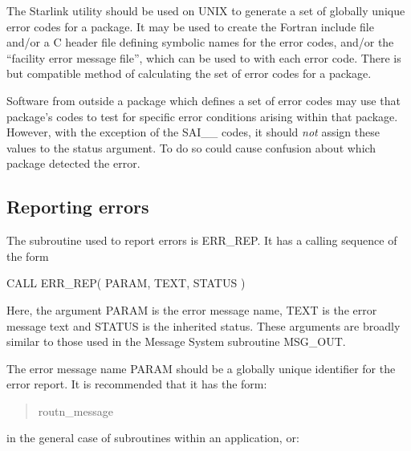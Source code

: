 \documentclass[twoside,11pt]{starlink}
\begin{document}
The Starlink utility
 
should be used on UNIX to generate
a set of globally unique error codes for a package. It may be used to create
the Fortran include file and/or a C header file defining symbolic names
for the error codes, and/or the ``facility error message file'', which
can be used to
with each error code.
There is
but compatible method of calculating the set of error codes for a
package.

Software from outside a package which defines a set of error codes may
use that package's codes to test for specific error conditions arising within
that package.
However, with the exception of the SAI\_\_ codes, it should \emph{not} assign
these values to the status argument.
To do so could cause confusion about which package detected the error.

\subsection{Reporting errors \label{report_sect}}

The subroutine used to report errors is ERR\_REP.
It has a calling sequence of the form

\begin {small}
\begin{terminalv}
      CALL ERR_REP( PARAM, TEXT, STATUS )
\end{terminalv}
\end {small}

Here, the argument PARAM is the error message name, TEXT is the error message
text and STATUS is the inherited status.
These arguments are broadly similar to those used in the Message System
subroutine MSG\_OUT.

The error message name PARAM should be a globally unique identifier for the
error report.
It is recommended that it has the form:

\begin {quote}
\begin {small}
\begin{terminalv}
routn_message
\end{terminalv}
\end {small}
\end {quote}

in the general case of subroutines within an application, or:
\end{document}
